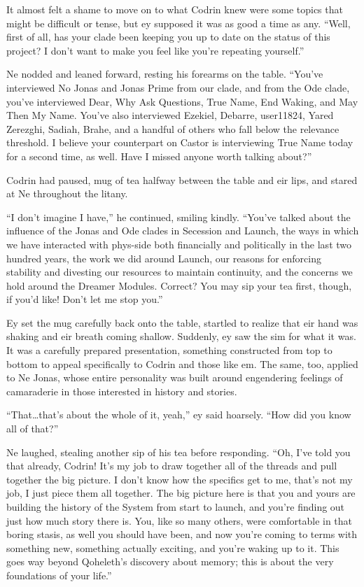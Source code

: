 It almost felt a shame to move on to what Codrin knew were some topics that might be difficult or tense, but ey supposed it was as good a time as any. ``Well, first of all, has your clade been keeping you up to date on the status of this project? I don't want to make you feel like you're repeating yourself.''

Ne nodded and leaned forward, resting his forearms on the table. ``You've interviewed No Jonas and Jonas Prime from our clade, and from the Ode clade, you've interviewed Dear, Why Ask Questions, True Name, End Waking, and May Then My Name. You've also interviewed Ezekiel, Debarre, user11824, Yared Zerezghi, Sadiah, Brahe, and a handful of others who fall below the relevance threshold. I believe your counterpart on Castor is interviewing True Name today for a second time, as well. Have I missed anyone worth talking about?''

Codrin had paused, mug of tea halfway between the table and eir lips, and stared at Ne throughout the litany.

``I don't imagine I have,'' he continued, smiling kindly. ``You've talked about the influence of the Jonas and Ode clades in Secession and Launch, the ways in which we have interacted with phys-side both financially and politically in the last two hundred years, the work we did around Launch, our reasons for enforcing stability and divesting our resources to maintain continuity, and the concerns we hold around the Dreamer Modules. Correct? You may sip your tea first, though, if you'd like! Don't let me stop you.''

Ey set the mug carefully back onto the table, startled to realize that eir hand was shaking and eir breath coming shallow. Suddenly, ey saw the sim for what it was. It was a carefully prepared presentation, something constructed from top to bottom to appeal specifically to Codrin and those like em. The same, too, applied to Ne Jonas, whose entire personality was built around engendering feelings of camaraderie in those interested in history and stories.

``That\ldots that's about the whole of it, yeah,'' ey said hoarsely. ``How did you know all of that?''

Ne laughed, stealing another sip of his tea before responding. ``Oh, I've told you that already, Codrin! It's my job to draw together all of the threads and pull together the big picture. I don't know how the specifics get to me, that's not my job, I just piece them all together. The big picture here is that you and yours are building the history of the System from start to launch, and you're finding out just how much story there is. You, like so many others, were comfortable in that boring stasis, as well you should have been, and now you're coming to terms with something new, something actually exciting, and you're waking up to it. This goes way beyond Qoheleth's discovery about memory; this is about the very foundations of your life.''

